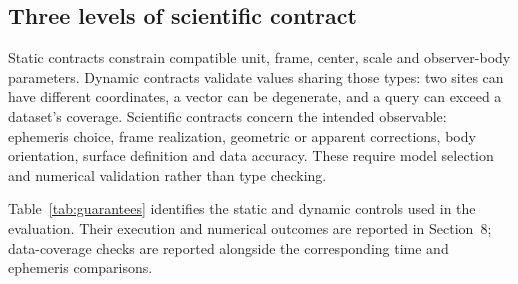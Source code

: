 \subsection{Three levels of scientific contract}

Static contracts constrain compatible unit, frame, center, scale and observer-body parameters.
Dynamic contracts validate values sharing those types: two sites can have different coordinates, a
vector can be degenerate, and a query can exceed a dataset's coverage. Scientific contracts concern
the intended observable: ephemeris choice, frame realization, geometric or apparent corrections,
body orientation, surface definition and data accuracy. These require model selection and numerical
validation rather than type checking.

Table~\ref{tab:guarantees} identifies the static and dynamic controls used in the evaluation. Their
execution and numerical outcomes are reported in Section~8; data-coverage checks are reported
alongside the corresponding time and ephemeris comparisons.

\begin{table}[!tbp]
    \centering
    \caption{Static and runtime semantic controls observed in the evaluated public interfaces.
        The controls check representation compatibility and value-dependent validity.}
    \label{tab:guarantees}
    \footnotesize
    
\end{table}
